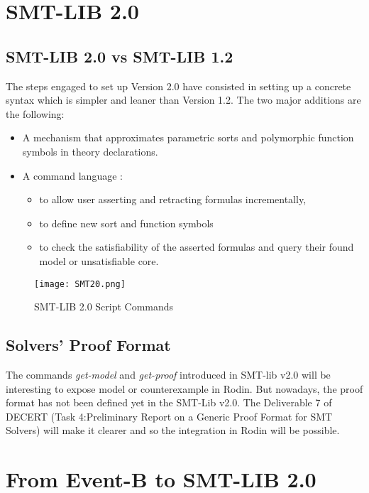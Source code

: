\section{SMT-LIB 2.0}
\subsection{SMT-LIB 2.0 vs SMT-LIB 1.2}
The steps engaged to set up Version 2.0 have consisted in setting up a concrete syntax which is simpler and leaner than Version 1.2.
The two major additions are the following:
\begin{itemize}
\item A mechanism that approximates parametric sorts and polymorphic function symbols in theory declarations.
\item A command language :
\begin{itemize}
\item to allow user asserting and retracting formulas incrementally,
\item to define new sort and function symbols
\item to check the satisfiability of the asserted formulas and query their found model or unsatisfiable core.
\end{itemize}
\end{itemize}


\begin{figure}
\centering
\texttt{[image: SMT20.png]}
\caption{SMT-LIB 2.0 Script Commands} 
\label{Fig:SMT-LIB 2.0}
\end{figure}

\subsection{Solvers' Proof Format}
The commands \textit{get-model} and \textit{get-proof} introduced in SMT-lib v2.0 will be interesting to expose model or counterexample in Rodin. But nowadays, the proof format has not been defined yet in the SMT-Lib v2.0. The Deliverable 7 of DECERT (Task 4:Preliminary Report on a Generic Proof Format for SMT Solvers) will make it clearer and so the integration in Rodin will be possible. 
 
\section{From Event-B to SMT-LIB 2.0}

